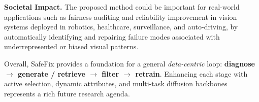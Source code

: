 \documentclass[10pt]{article} %
\newcommand{\model}{SafeFix\xspace}
\begin{document}
\textbf{Societal Impact.} The proposed method could be important for real-world applications such as fairness auditing and reliability improvement in vision systems deployed in robotics, healthcare, surveillance, and auto-driving, by automatically identifying and repairing failure modes associated with underrepresented or biased visual patterns.

Overall, \model{} provides a foundation for a general \emph{data-centric}
loop: \textbf{diagnose $\rightarrow$ generate / retrieve $\rightarrow$
filter $\rightarrow$ retrain}. Enhancing each stage with active
selection, dynamic attributes, and multi-task diffusion backbones
represents a rich future research agenda.
\end{document}
